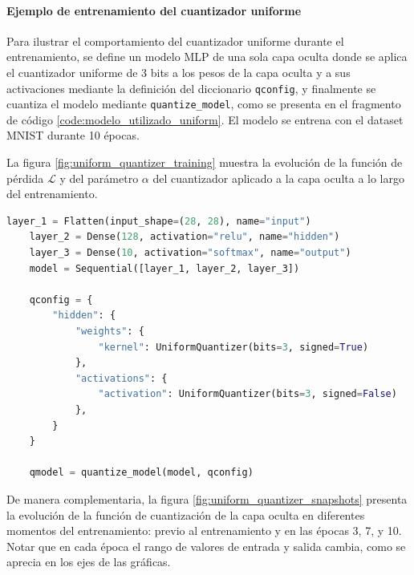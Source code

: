\paragraph{Ejemplo de entrenamiento del cuantizador uniforme}

Para ilustrar el comportamiento del cuantizador uniforme durante el entrenamiento, se define un modelo MLP de una sola capa oculta donde se aplica el cuantizador uniforme de 3 bits a los pesos de la capa oculta y a sus activaciones mediante la definición del diccionario \texttt{qconfig}, y finalmente se cuantiza el modelo mediante \texttt{quantize\_model}, como se presenta en el fragmento de código \ref{code:modelo_utilizado_uniform}. El modelo se entrena con el dataset MNIST \cite{lecun1998gradient} durante 10 épocas.

La figura \ref{fig:uniform_quantizer_training} muestra la evolución de la función de pérdida $\mathcal{L}$ y del parámetro $\alpha$ del cuantizador aplicado a la capa oculta a lo largo del entrenamiento.

\vspace{0.2cm}
\begin{lstlisting}[language=Python,label=code:modelo_utilizado_uniform,caption={Definición de un modelo MLP de una sola capa oculta con Keras, con cuantización uniforme}]
    layer_1 = Flatten(input_shape=(28, 28), name="input")
    layer_2 = Dense(128, activation="relu", name="hidden")
    layer_3 = Dense(10, activation="softmax", name="output")
    model = Sequential([layer_1, layer_2, layer_3])

    qconfig = {
        "hidden": {
            "weights": {
                "kernel": UniformQuantizer(bits=3, signed=True)
            },
            "activations": {
                "activation": UniformQuantizer(bits=3, signed=False)
            },
        }
    }

    qmodel = quantize_model(model, qconfig)
\end{lstlisting}



De manera complementaria, la figura \ref{fig:uniform_quantizer_snapshots} presenta la evolución de la función de cuantización de la capa oculta en diferentes momentos del entrenamiento: previo al entrenamiento y en las épocas 3, 7, y 10. Notar que en cada época el rango de valores de entrada y salida cambia, como se aprecia en los ejes de las gráficas.

